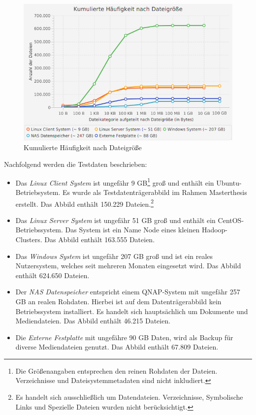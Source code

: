  \begin{figure}[ht]
  \centering
  \includegraphics[width=\textwidth]{./resource/fileSize_cumulatedAmount.png}
  \caption{Kumulierte Häufigkeit nach Dateigröße}
  \label{fig:file_size_c_amount}
\end{figure}

\noindent
Nachfolgend werden die Testdaten beschrieben:
\begin{itemize}
\item Das \textit{Linux Client System} ist ungefähr 9 GB\footnote{Die Größenangaben entsprechen den reinen Rohdaten der Dateien. Verzeichnisse und Dateisystemmetadaten sind nicht inkludiert.} groß und enthält ein Ubuntu-Betriebsystem. Es wurde als Testdatenträgerabbild im Rahmen Masterthesis erstellt. Das Abbild enthält 150.229 Dateien.\footnote{Es handelt sich ausschließlich um Datendateien. Verzeichnisse, Symbolische Links und Spezielle Dateien wurden nicht berücksichtigt.}
\item Das \textit{Linux Server System} ist ungefähr 51 GB groß und enthält ein CentOS-Betriebssystem. Das System ist ein Name Node eines kleinen Hadoop-Clusters. Das Abbild enthält 163.555 Dateien.
\item Das \textit{Windows System} ist ungefähr 207 GB groß und ist ein reales Nutzersystem, welches seit mehreren Monaten eingesetzt wird. Das Abbild enthält 624.650 Dateien.
\item Der \textit{NAS Datenspeicher} entspricht einem QNAP-System mit ungefähr 257 GB an realen Rohdaten. Hierbei ist auf dem Datenträgerabbild kein Betriebssystem installiert. Es handelt sich hauptsächlich um Dokumente und Mediendateien. Das Abbild enthält 46.215 Dateien.
\item Die \textit{Externe Festplatte} mit ungefähre 90 GB Daten, wird als Backup für diverse Mediendateien genutzt. Das Abbild enthält 67.809 Dateien.
\end{itemize}

